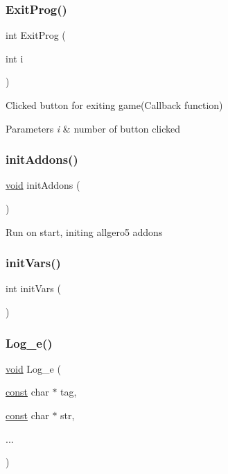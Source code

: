 \subsubsection{\texorpdfstring{Exit\+Prog()}{ExitProg()}}
{\footnotesize\ttfamily int Exit\+Prog (\begin{DoxyParamCaption}\item[{int}]{i }\end{DoxyParamCaption})}

Clicked button for exiting game(\+Callback function) 
\begin{DoxyParams}{Parameters}
{\em i} & number of button clicked \\
\hline
\end{DoxyParams}
\mbox{\label{group___core_gad48a041724bbc05fba4b66ce7530edb2}} 
\subsubsection{\texorpdfstring{init\+Addons()}{initAddons()}}
{\footnotesize\ttfamily \hyperlink{png_8h_ac9c84fa68bbad002983e35ce3663c686}{void} init\+Addons (\begin{DoxyParamCaption}{ }\end{DoxyParamCaption})}

Run on start, initing allgero5 addons \mbox{\label{group___core_ga5556333d0547b17be08de1a701d61e2c}} 
\subsubsection{\texorpdfstring{init\+Vars()}{initVars()}}
{\footnotesize\ttfamily int init\+Vars (\begin{DoxyParamCaption}{ }\end{DoxyParamCaption})}

\mbox{\label{group___core_ga5a29994cc1a93c0124f65b27a5daa5aa}} 
\subsubsection{\texorpdfstring{Log\+\_\+e()}{Log\_e()}}
{\footnotesize\ttfamily \hyperlink{png_8h_ac9c84fa68bbad002983e35ce3663c686}{void} Log\+\_\+e (\begin{DoxyParamCaption}\item[{\hyperlink{zconf_8h_a2c212835823e3c54a8ab6d95c652660e}{const} char $\ast$}]{tag,  }\item[{\hyperlink{zconf_8h_a2c212835823e3c54a8ab6d95c652660e}{const} char $\ast$}]{str,  }\item[{}]{... }\end{DoxyParamCaption})}

